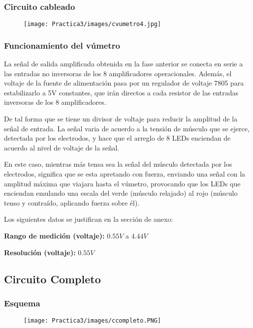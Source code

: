 \documentclass[12pt]{article}
\begin{document}
	\subsubsection{Circuito cableado}
		\begin{figure}[h!]
                \centering
                \texttt{[image: Practica3/images/cvumetro4.jpg]}
    \end{figure} 
    
    
	\subsubsection{Funcionamiento del vúmetro}
	La señal de salida amplificada obtenida en la fase anterior se conecta en serie a las entradas no inversoras de los 8 amplificadores operacionales. Además, el voltaje de la fuente de alimentación pasa por un regulador de voltaje 7805 para estabilizarlo a 5V constantes, que irán directos a cada resistor de las entradas inversoras de los 8 amplificadores.
	        
	De tal forma que se tiene un divisor de voltaje para reducir la amplitud de la señal de entrada. La señal varia de acuerdo a la tensión de músculo que se ejerce, detectada por los electrodos, y hace que el arreglo de 8 LEDs enciendan de acuerdo al nivel de voltaje de la señal.
	        
	En este caso, mientras más tensa sea la señal del músculo detectada por los electrodos, significa que se esta apretando con fuerza, enviando una señal con la amplitud máxima que viajara hasta el vúmetro, provocando que los LEDs que enciendan emulando una escala del verde (músculo relajado) al rojo (músculo tenso y contraído, aplicando fuerza sobre él).
	        
	Los siguientes datos se justifican en la sección de anexo: 
	        
	\textbf{Rango de medición (voltaje):} $0.55 V$ a $4.44 V$
	        
	\textbf{Resolución (voltaje):} $0.55 V$
	
	\newpage
	\subsection{Circuito Completo}
	\subsubsection{Esquema}
	\begin{figure}[h!]
                \centering
                \texttt{[image: Practica3/images/ccompleto.PNG]}
    \end{figure} 
    
\end{document}
